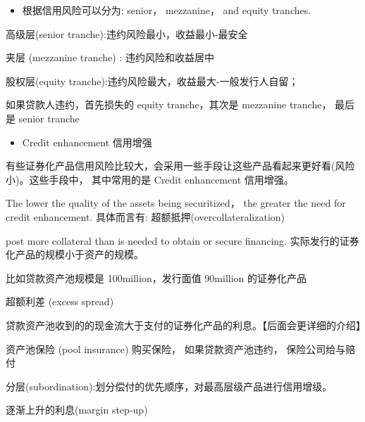 \begin{center}
\end{center}

\begin{itemize}
\item 根据信用风险可以分为: senior， mezzanine， and equity tranches.
\end{itemize}

高级层(senior tranche):违约风险最小，收益最小-最安全

 夹层 (mezzanine tranche) : 违约风险和收益居中

 股权层(equity tranche):违约风险最大，收益最大-一般发行人自留；

 如果贷款人违约，首先损失的 equity tranche，其次是 mezzanine tranche， 最后是 senior tranche

\begin{itemize}
\item Credit enhancement 信用增强
\end{itemize}

有些证券化产品信用风险比较大，会采用一些手段让这些产品看起来更好看(风险小)。这些手段中， 其中常用的是 Credit enhancement 信用增强。

The lower the quality of the assets being securitized， the greater the need for credit enhancement. 具体而言有: 超额抵押(overcollateralization)

post more collateral than is needed to obtain or secure financing. 实际发行的证券化产品的规模小于资产的规模。

比如贷款资产池规模是 100million，发行面值 90million 的证券化产品

超额利差 (excess spread)

贷款资产池收到的的现金流大于支付的证券化产品的利息。【后面会更详细的介绍】

资产池保险 (pool insurance) 购买保险， 如果贷款资产池违约， 保险公司给与赔付

分层(subordination):划分偿付的优先顺序，对最高层级产品进行信用增级。

逐渐上升的利息(margin step-up)

